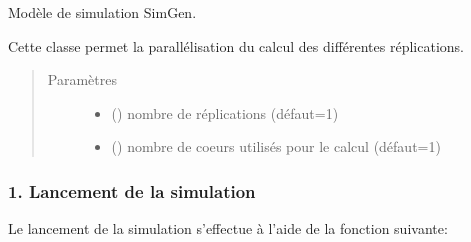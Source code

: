 \documentclass[letterpaper,10pt,french]{sphinxmanual}
\begin{document}

\begin{fulllineitems}
\label{\detokenize{utilisation:simgen.replicate}}
Modèle de simulation SimGen.

Cette classe permet la parallélisation du calcul des différentes réplications.
\begin{quote}\begin{description}
\item[{Paramètres}] \leavevmode\begin{itemize}
\item {} 
 () \textendash{} nombre de réplications (défaut=1)

\item {} 
 () \textendash{} nombre de coeurs utilisés pour le calcul (défaut=1)

\end{itemize}

\end{description}\end{quote}

\end{fulllineitems}


\begin{DUlineblock}{0em}
\item[] 
\end{DUlineblock}


\subsubsection{1. Lancement de la simulation}
\label{\detokenize{utilisation:lancement-de-la-simulation}}
Le lancement de la simulation s’effectue à l’aide de la fonction suivante:

\begin{sphinxVerbatim}[commandchars=\\\{\}]
\end{sphinxVerbatim}
\end{document}
